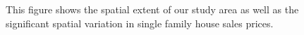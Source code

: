 \documentclass{article}\usepackage{graphicx, color}
\begin{document}
\begin{figure}
\caption{This figure shows the spatial extent of our study area as well as the significant spatial variation in single family house sales prices.}\label{fig:overview}
\end{figure}
\end{document}
